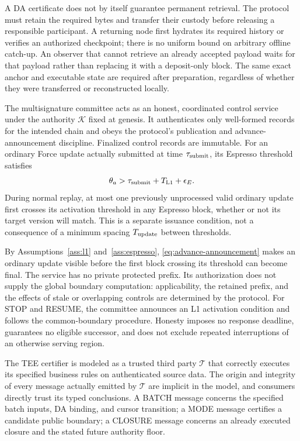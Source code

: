 A DA certificate does not by itself guarantee permanent retrieval.
The protocol must retain the required bytes and transfer their custody
before releasing a responsible participant.  A returning node first
hydrates its required history or verifies an authorized checkpoint;
there is no uniform bound on arbitrary offline catch-up.  An observer
that cannot retrieve an already accepted payload waits for that payload
rather than replacing it with a deposit-only block.  The same exact
anchor and executable state are required after preparation, regardless
of whether they were transferred or reconstructed locally.

\begin{assumption}
\label{ass:control}
The multisignature committee acts as an honest, coordinated control
service under the authority $\mathcal K$ fixed at genesis.  It
authenticates only well-formed records for the intended chain and obeys
the protocol's publication and advance-announcement discipline.
Finalized control records are immutable.  For an ordinary Force update
actually submitted at time $\tau_{\rm submit}$, its Espresso threshold
satisfies
\begin{equation}
\label{eq:advance-announcement}
 \theta_a>\tau_{\rm submit}+T_{\rm L1}+\epsilon_E.
\end{equation}
During normal replay, at most one previously unprocessed valid ordinary
update first crosses its activation threshold in any Espresso block,
whether or not its target version will match.  This is a
separate issuance condition, not a consequence of a minimum spacing
$T_{\rm update}$ between thresholds.
\end{assumption}

By Assumptions~\ref{ass:l1} and~\ref{ass:espresso},
\eqref{eq:advance-announcement} makes an ordinary update visible before
the first block crossing its threshold can become final.  The service
has no private protected prefix.  Its authorization does not supply the
global boundary computation: applicability, the retained prefix, and
the effects of stale or overlapping controls are determined by the
protocol.  For STOP and RESUME, the committee announces an L1 activation
condition and follows the common-boundary procedure.  Honesty imposes
no response deadline, guarantees no eligible successor, and does not
exclude repeated interruptions of an otherwise serving region.

\begin{assumption}
\label{ass:trusted-certifier}
The TEE certifier is modeled as a trusted third party $\mathcal T$ that
correctly executes its specified business rules on authenticated source
data.  The origin and integrity of every message actually emitted by
$\mathcal T$ are implicit in the model, and consumers directly trust
its typed conclusions.  A \textup{BATCH} message concerns the specified
batch inputs, DA binding, and cursor transition; a \textup{MODE}
message certifies a candidate public boundary; a \textup{CLOSURE}
message concerns an already executed closure and the stated future
authority floor.
\end{assumption}

